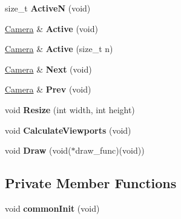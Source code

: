 \begin{DoxyCompactItemize}
\item 
\hypertarget{class_cameras_aaf404448da0f438645827ee3558bf077}{size\-\_\-t {\bfseries Active\-N} (void)}\label{class_cameras_aaf404448da0f438645827ee3558bf077}

\item 
\hypertarget{class_cameras_a66a0741c023da5ef362f501ea255d65e}{\hyperlink{class_camera}{Camera} \& {\bfseries Active} (void)}\label{class_cameras_a66a0741c023da5ef362f501ea255d65e}

\item 
\hypertarget{class_cameras_a8e6b90d6a3f2b3654ee02c703172c98d}{\hyperlink{class_camera}{Camera} \& {\bfseries Active} (size\-\_\-t n)}\label{class_cameras_a8e6b90d6a3f2b3654ee02c703172c98d}

\item 
\hypertarget{class_cameras_a60d90887fd811a6cdfe0ffab75e63594}{\hyperlink{class_camera}{Camera} \& {\bfseries Next} (void)}\label{class_cameras_a60d90887fd811a6cdfe0ffab75e63594}

\item 
\hypertarget{class_cameras_a9f13d3876229fdcf19640af01be1b95f}{\hyperlink{class_camera}{Camera} \& {\bfseries Prev} (void)}\label{class_cameras_a9f13d3876229fdcf19640af01be1b95f}

\item 
\hypertarget{class_cameras_a72155a9003f5976b455482d65d0a61ff}{void {\bfseries Resize} (int width, int height)}\label{class_cameras_a72155a9003f5976b455482d65d0a61ff}

\item 
\hypertarget{class_cameras_ab3bdf41248da9246efeeea4302136c11}{void {\bfseries Calculate\-Viewports} (void)}\label{class_cameras_ab3bdf41248da9246efeeea4302136c11}

\item 
\hypertarget{class_cameras_adaca996b6dac14e2db89c31ff369d3b4}{void {\bfseries Draw} (void($\ast$draw\-\_\-func)(void))}\label{class_cameras_adaca996b6dac14e2db89c31ff369d3b4}

\end{DoxyCompactItemize}
\subsection*{Private Member Functions}
\begin{DoxyCompactItemize}
\item 
\hypertarget{class_cameras_ab3b5bb710ab76cacf8c9177a29b1bc8b}{void {\bfseries common\-Init} (void)}\label{class_cameras_ab3b5bb710ab76cacf8c9177a29b1bc8b}

\end{DoxyCompactItemize}
